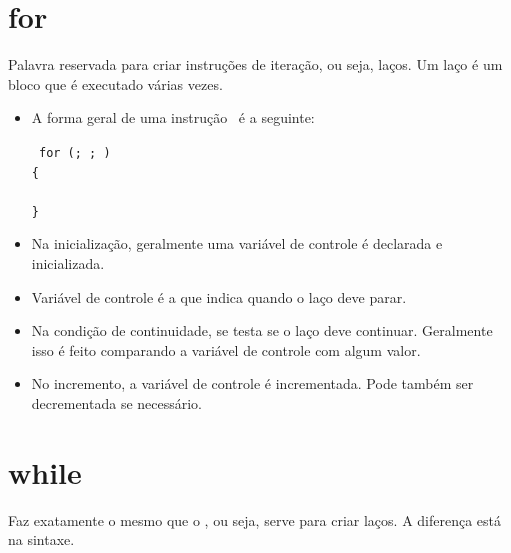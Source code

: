 \section{for}
\label{sec:for}

Palavra reservada para criar instruções de iteração, ou seja, laços. Um laço é um bloco que é executado várias vezes.

\begin{itemize}

\item A forma geral de uma instrução \FOR\ é a seguinte:

{\tt 
for (; ; ) \\
\{                                                            \\
\TAB {}                     \\
\}                                                            \\
}

\item Na inicialização, geralmente uma variável de controle é declarada e inicializada.
\item Variável de controle é a que indica quando o laço deve parar.
\item Na condição de continuidade, se testa se o laço deve continuar. Geralmente isso é feito comparando a variável de controle com algum valor.
\item No incremento, a variável de controle é incrementada. Pode também ser decrementada se necessário.

\end{itemize}


\section{while}
\label{sec:while}

Faz exatamente o mesmo que o \FOR, ou seja, serve para criar laços. A diferença está na sintaxe.

